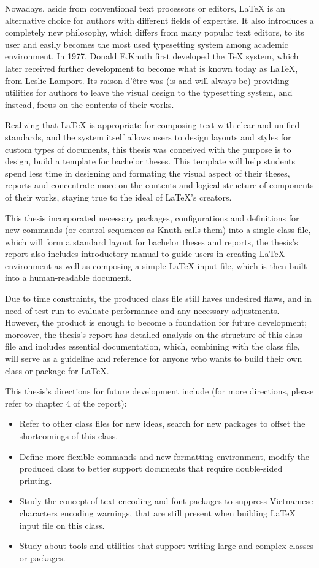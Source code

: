 \documentclass{vlththesis}
\begin{document}
Nowadays, aside from conventional text processors or editors, LaTeX is an alternative choice for
authors with different fields of expertise. It also introduces a completely new philosophy, which differs
from many popular text editors, to its user and easily becomes the most used typesetting system among
academic environment. In 1977, Donald E.Knuth first developed the TeX system, which later received
further development to become what is known today as LaTeX, from Leslie Lamport. Its raison d'être was
(is and will always be) providing utilities for authors to leave the visual design to the typesetting
system, and instead, focus on the contents of their works.\par
Realizing that LaTeX is appropriate for composing text with clear and unified standards, and the system
itself allows users to design layouts and styles for custom types of documents, this thesis was conceived
with the purpose is to design, build a template for bachelor theses. This template will help students spend
less time in designing and formating the visual aspect of their theses, reports and concentrate more on
the contents and logical structure of components of their works, staying true to the ideal of LaTeX's creators.\par
This thesis incorporated necessary packages, configurations and definitions for new commands (or control sequences as Knuth calls them)
into a single class file, which will form a standard layout for bachelor theses and reports, the thesis's report also
includes introductory manual to guide users in creating LaTeX environment as well as composing a simple LaTeX input file, which
is then built into a human-readable document.\par
Due to time constraints, the produced class file still haves undesired flaws, and in need of
test-run to evaluate performance and any necessary adjustments. However, the product is enough
to become a foundation for future development; moreover, the thesis's report has detailed analysis
on the structure of this class file and includes essential documentation, which, combining with
the class file, will serve as a guideline and reference for anyone who wants to build their own class or
package for LaTeX.\par
This thesis's directions for future development include (for more directions, please refer to chapter 4 of the report):\par
\begin{itemize}
 \item Refer to other class files for new ideas, search for new packages to offset the shortcomings of
 this class.
 \item Define more flexible commands and new formatting environment, modify the produced class to better support
 documents that require double-sided printing.
 \item Study the concept of text encoding and font packages to suppress Vietnamese characters encoding warnings, that
 are still present when building LaTeX input file on this class.
 \item Study about tools and utilities that support writing large and complex classes or packages.
\end{itemize}
\end{document}
